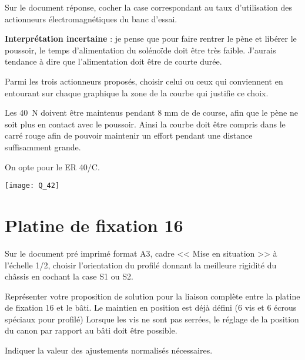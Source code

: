 \documentclass[11pt]{article}
\begin{document}
\UPSTIquestion Sur le document réponse, cocher la case correspondant au taux d'utilisation des actionneurs électromagnétiques du banc d'essai.

\begin{UPSTIcorrige}
\textbf{Interprétation incertaine} : je pense que pour faire rentrer le pène et libérer le poussoir, le temps d'alimentation du solénoïde doit être très faible. J'aurais tendance à dire que l'alimentation doit être de courte durée. 
\end{UPSTIcorrige}

\UPSTIquestion Parmi les trois actionneurs proposés, choisir celui ou ceux qui conviennent en entourant sur chaque graphique la zone de la courbe qui justifie ce choix.

\begin{UPSTIcorrige}
Les \SI{40}{N} doivent être maintenus pendant 8 mm de de course, afin que le pène ne soit plus en contact avec le poussoir. Ainsi la courbe doit être compris dans le carré rouge afin de pouvoir maintenir un effort pendant une distance suffisamment grande. 

On opte pour le ER 40/C.

\begin{center}
\texttt{[image: Q\_42]}
\end{center}


\end{UPSTIcorrige}



\section{Platine de fixation 16}

\UPSTIquestion* Sur le document pré imprimé format A3, cadre << Mise en situation >> à l'échelle 1/2, choisir l'orientation du profilé donnant la meilleure rigidité du châssis en cochant la case S1 ou S2. 
\begin{UPSTIcorrige}
\end{UPSTIcorrige}

\UPSTIquestion Représenter votre proposition de solution pour la liaison complète entre la platine de fixation 16 et le bâti. Le maintien en position est déjà défini (6 vis et 6 écrous spéciaux pour profilé) Lorsque les vis ne sont pas serrées, le réglage de la position du canon par rapport au bâti doit être possible.
 
Indiquer la valeur des ajustements normalisés nécessaires.
\begin{UPSTIcorrige}
\end{UPSTIcorrige}
\end{document}
